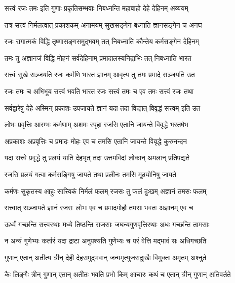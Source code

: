 \twolineshloka
{सत्त्वं रजः तमः इति गुणाः प्रकृतिसम्भवाः}
{निबध्नन्ति महाबाहो देहे देहिनम् अव्ययम्}%

\twolineshloka
{तत्र सत्त्वं निर्मलत्वात् प्रकाशकम् अनामयम्}
{सुखसङ्गेन बध्नाति ज्ञानसङ्गेन च अनघ}%

\twolineshloka
{रजः रागात्मकं विद्धि तृष्णासङ्गसमुद्भवम्}
{तत् निबध्नाति कौन्तेय कर्मसङ्गेन देहिनम्}%

\twolineshloka
{तमः तु अज्ञानजं विद्धि मोहनं सर्वदेहिनाम्}
{प्रमादालस्यनिद्राभिः तत् निबध्नाति भारत}%

\twolineshloka
{सत्त्वं सुखे सञ्जयति रजः कर्मणि भारत}
{ज्ञानम् आवृत्य तु तमः प्रमादे सञ्जयति उत}%

\twolineshloka
{रजः तमः च अभिभूय सत्त्वं भवति भारत}
{रजः सत्त्वं तमः च एव तमः सत्त्वं रजः तथा}%

\twolineshloka
{सर्वद्वारेषु देहे अस्मिन् प्रकाशः उपजायते}
{ज्ञानं यदा तदा विद्यात् विवृद्धं सत्त्वम् इति उत}%

\twolineshloka
{लोभः प्रवृत्तिः आरम्भः कर्मणाम् अशमः स्पृहा}
{रजसि एतानि जायन्ते विवृद्धे भरतर्षभ}%

\twolineshloka
{अप्रकाशः अप्रवृत्तिः च प्रमादः मोहः एव च}
{तमसि एतानि जायन्ते विवृद्धे कुरुनन्दन}%

\twolineshloka
{यदा सत्त्वे प्रवृद्धे तु प्रलयं याति देहभृत्}
{तदा उत्तमविदां लोकान् अमलान् प्रतिपद्यते}%

\twolineshloka
{रजसि प्रलयं गत्वा कर्मसङ्गिषु जायते}
{तथा प्रलीनः तमसि मूढयोनिषु जायते}%

\twolineshloka
{कर्मणः सुकृतस्य आहुः सात्त्विकं निर्मलं फलम्}
{रजसः तु फलं दुःखम् अज्ञानं तमसः फलम्}%

\twolineshloka
{सत्त्वात् सञ्जायते ज्ञानं रजसः लोभः एव च}
{प्रमादमोहौ तमसः भवतः अज्ञानम् एव च}%

\twolineshloka
{ऊर्ध्वं गच्छन्ति सत्त्वस्थाः मध्ये तिष्ठन्ति राजसाः}
{जघन्यगुणवृत्तिस्थाः अधः गच्छन्ति तामसाः}%

\twolineshloka
{न अन्यं गुणेभ्यः कर्तारं यदा द्रष्टा अनुपश्यति}
{गुणेभ्यः च परं वेत्ति मद्भावं सः अधिगच्छति}%

\twolineshloka
{गुणान् एतान् अतीत्य त्रीन् देही देहसमुद्भवान्}
{जन्ममृत्युजरादुःखैः विमुक्तः अमृतम् अश्नुते}%


\twolineshloka
{कैः लिङ्गैः त्रीन् गुणान् एतान् अतीतः भवति प्रभो}
{किम् आचारः कथं च एतान् त्रीन् गुणान् अतिवर्तते}%

